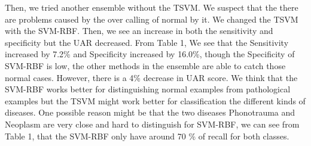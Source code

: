 Then, we tried another ensemble without the TSVM. We suspect that the there are problems caused by the over calling of normal by it. We changed the TSVM with the SVM-RBF. Then, we see an increase in both the sensitivity and specificity but the UAR decreased. From Table 1, We see that the Sensitivity increased by 7.2\% and Specificity increased by 16.0\%, though the Specificity of SVM-RBF is low, the other methods in the ensemble are able to catch those normal cases. However, there is a 4\% decrease in UAR score. We think that the SVM-RBF works better for distinguishing normal examples from pathological examples but the TSVM might work better for classification the different kinds of diseases. One possible reason might be that the two diseases Phonotrauma and Neoplasm are very close and hard to distinguish for SVM-RBF, we can see from Table 1, that the SVM-RBF only have around 70 \% of recall for both classes.
 
